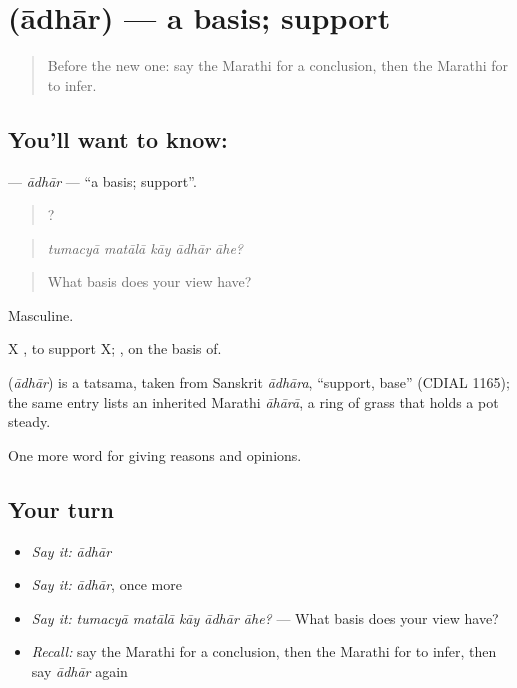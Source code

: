 \section[\texorpdfstring{\mr{आधार} (ādhār)}{आधार (ādhār)}]{ (ādhār) — a basis; support}

\label{lesson:MR-C345-adhar}



\begin{quote}
Before the new one: say the Marathi for a conclusion, then the Marathi for to infer.
\end{quote}

\subsection*{You'll want to know: }
\textbf{} — \emph{ādhār} — \textquotedblleft{}a basis; support\textquotedblright{}.

\begin{quote}
    ?
\end{quote}

\begin{quote}
\emph{tumacyā matālā kāy ādhār āhe?}
\end{quote}

\begin{quote}
What basis does your view have?
\end{quote}

Masculine.

X   , to support X;  , on the basis of.

\begin{cousinweb}
\textbf{} (\emph{ādhār}) is a tatsama, taken from Sanskrit \emph{ādhāra}, \textquotedblleft{}support, base\textquotedblright{} (CDIAL 1165); the same entry lists an inherited Marathi \emph{āhārā}, a ring of grass that holds a pot steady.
\end{cousinweb}

\begin{grammarlens}[title={What you've built}]
One more word for giving reasons and opinions.
\end{grammarlens}

\subsection*{Your turn}
\begin{itemize}
\raggedright
  \item \emph{Say it:} \emph{ādhār}
  \item \emph{Say it:} \emph{ādhār}, once more
  \item \emph{Say it:} \emph{tumacyā matālā kāy ādhār āhe?} — What basis does your view have?
  \item \emph{Recall:} say the Marathi for a conclusion, then the Marathi for to infer, then say \emph{ādhār} again
\end{itemize}


